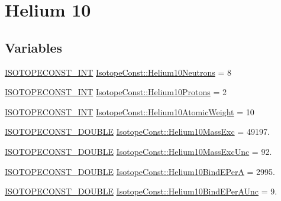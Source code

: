 \hypertarget{group___isotope_const-_helium-_he10}{}\section{Helium 10}
\label{group___isotope_const-_helium-_he10}
\subsection*{Variables}
\begin{DoxyCompactItemize}
\item 
\mbox{\hyperlink{group___isotope_const-_macros_ga5f18360b3e99483a35c32d789e62621c}{I\+S\+O\+T\+O\+P\+E\+C\+O\+N\+S\+T\+\_\+\+I\+NT}} \mbox{\hyperlink{group___isotope_const-_helium-_he10_ga3236142ca4081f111857daf8d4cd10c2}{Isotope\+Const\+::\+Helium10\+Neutrons}} = 8
\item 
\mbox{\hyperlink{group___isotope_const-_macros_ga5f18360b3e99483a35c32d789e62621c}{I\+S\+O\+T\+O\+P\+E\+C\+O\+N\+S\+T\+\_\+\+I\+NT}} \mbox{\hyperlink{group___isotope_const-_helium-_he10_gaf5987e16ae3bc4a247a41509ca6c8ffe}{Isotope\+Const\+::\+Helium10\+Protons}} = 2
\item 
\mbox{\hyperlink{group___isotope_const-_macros_ga5f18360b3e99483a35c32d789e62621c}{I\+S\+O\+T\+O\+P\+E\+C\+O\+N\+S\+T\+\_\+\+I\+NT}} \mbox{\hyperlink{group___isotope_const-_helium-_he10_ga015827910af310cc8986f2f901ea4835}{Isotope\+Const\+::\+Helium10\+Atomic\+Weight}} = 10
\item 
\mbox{\hyperlink{group___isotope_const-_macros_ga8f45a7272ce02c0b4c65c44636ed719a}{I\+S\+O\+T\+O\+P\+E\+C\+O\+N\+S\+T\+\_\+\+D\+O\+U\+B\+LE}} \mbox{\hyperlink{group___isotope_const-_helium-_he10_ga0d27f6e3ef7231a1f4f177d2822b1acc}{Isotope\+Const\+::\+Helium10\+Mass\+Exc}} = 49197.
\item 
\mbox{\hyperlink{group___isotope_const-_macros_ga8f45a7272ce02c0b4c65c44636ed719a}{I\+S\+O\+T\+O\+P\+E\+C\+O\+N\+S\+T\+\_\+\+D\+O\+U\+B\+LE}} \mbox{\hyperlink{group___isotope_const-_helium-_he10_gaf224dd2276fd21fb6f3ee1b44afc4f11}{Isotope\+Const\+::\+Helium10\+Mass\+Exc\+Unc}} = 92.
\item 
\mbox{\hyperlink{group___isotope_const-_macros_ga8f45a7272ce02c0b4c65c44636ed719a}{I\+S\+O\+T\+O\+P\+E\+C\+O\+N\+S\+T\+\_\+\+D\+O\+U\+B\+LE}} \mbox{\hyperlink{group___isotope_const-_helium-_he10_gac515281d741c9d78906cff7caae5c27d}{Isotope\+Const\+::\+Helium10\+Bind\+E\+PerA}} = 2995.
\item 
\mbox{\hyperlink{group___isotope_const-_macros_ga8f45a7272ce02c0b4c65c44636ed719a}{I\+S\+O\+T\+O\+P\+E\+C\+O\+N\+S\+T\+\_\+\+D\+O\+U\+B\+LE}} \mbox{\hyperlink{group___isotope_const-_helium-_he10_ga360b8fb1f825528c9e5d401f4926564d}{Isotope\+Const\+::\+Helium10\+Bind\+E\+Per\+A\+Unc}} = 9.

\end{DoxyCompactItemize}
